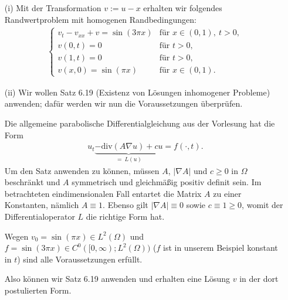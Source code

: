 \begin{solution}

\phantom{} \begin{itemize}
    \item[(i)] Mit der Transformation $v := u - x$ erhalten wir folgendes Randwertproblem mit homogenen Randbedingungen:
    \begin{align}
        \begin{cases}
            v_t - v_{xx} + v = \sin(3\pi x) & \text{für~} x \in (0, 1),~ t > 0,\\
            v(0, t) = 0 & \text{für~} t > 0,\\
            v(1, t) = 0 & \text{für~} t > 0,\\
            v(x, 0) = \sin(\pi x) & \text{für~} x \in (0, 1).
        \end{cases}
    \end{align}\label{rwp}

    \item[(ii)] Wir wollen Satz 6.19 (Existenz von Lösungen inhomogener Probleme) anwenden; dafür werden wir nun die Voraussetzungen überprüfen.

    Die allgemeine parabolische Differentialgleichung aus der Vorlesung hat die Form
    \begin{align}
        u_t \underbrace{- \mathrm{div}(A \nabla u) + cu}_{=~ L(u)} = f(\cdot, t).
    \end{align}
    Um den Satz anwenden zu können, müssen $A$, $|\nabla A|$ und $c \geq 0$ in $\Omega$ beschränkt und $A$ symmetrisch und gleichmäßig positiv definit sein.
    Im betrachteten eindimensionalen Fall entartet die Matrix $A$ zu einer Konstanten, nämlich $A \equiv 1.$ Ebenso gilt $|\nabla A| \equiv 0$ sowie $c \equiv 1 \geq 0$, womit der Differentialoperator $L$ die richtige Form hat.

    Wegen $v_0 = \sin(\pi x) \in L^2(\Omega)$ und $f = \sin(3\pi x) \in C^0([0, \infty); L^2(\Omega))$ ($f$ ist in unserem Beispiel konstant in $t$) sind alle Voraussetzungen erfüllt.

    Also können wir Satz 6.19 anwenden und erhalten eine Lösung $v$ in der dort postulierten Form.


\end{itemize}
\end{solution}
